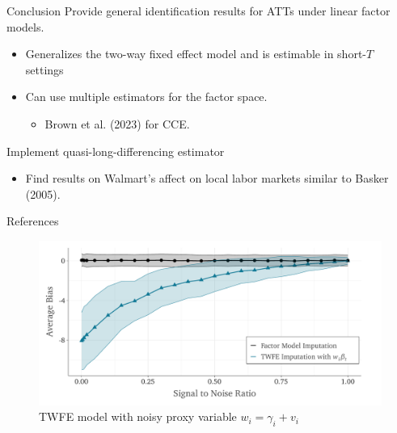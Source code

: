 \documentclass[aspectratio=169,t,11pt]{beamer}
\begin{document}
\begin{frame}{Conclusion}
  Provide general identification results for ATTs under linear factor models. 
  \begin{itemize}
      \item Generalizes the two-way fixed effect model and is estimable in short-$T$ settings
      \item Can use multiple estimators for the factor space. 
      \begin{itemize}
          \item Brown et al. (2023) for CCE.
      \end{itemize}
  \end{itemize}

  \bigskip
  Implement quasi-long-differencing estimator
  \begin{itemize}
      \item Find results on Walmart's affect on local labor markets similar to Basker (2005). 
  \end{itemize}
\end{frame}

\begin{frame}[allowframebreaks]{References}
  \printbibliography
\end{frame}
\appendix



\begin{frame}{}\label{slide:noisy_xi_simulations}
  \begin{figure}
    \caption{TWFE model with noisy proxy variable $w_i = \gamma_i + v_i$}
    \begin{adjustbox}{width=0.9\textwidth}
      \includegraphics{../figures/simulation-bias_signal_to_noise.pdf}
    \end{adjustbox}
  \end{figure}
  
\end{frame}
\end{document}
